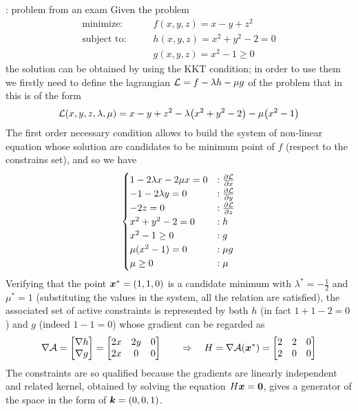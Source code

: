 	
	\begin{example}{: problem from an exam}
		Given the problem
		\begin{align*}
			\textrm{minimize:} \qquad & f(x,y,z) = x - y + z^2 \\
			\textrm{subject to:} \qquad & h(x,y,z) = x^2 + y^2 - 2 = 0 \\
			& g(x,y,z) = x^2-1 \geq 0
		\end{align*}
		the solution can be obtained by using the KKT condition; in order to use them we firstly need to define the lagrangian $\mathcal L = f - \lambda h - \mu g$ of the problem that in this is of the form
		\[ \mathcal L(x,y,z,\lambda,\mu) = x - y + z^2 - \lambda\big(x^2+y^2-2\big) - \mu \big(x^2 - 1\big) \]
		The first order necessary condition allows to build the system of non-linear equation whose solution are candidates to be minimum point of $f$ (respect to the constrains set), and so we have
		\[ \begin{cases}
			1 -2 \lambda x - 2\mu x = 0 & : \frac{\partial \mathcal L}{\partial x} \\
			-1 - 2\lambda y = 0 & : \frac{\partial \mathcal L}{\partial y} \\
			-2z = 0 & : \frac{\partial \mathcal L}{\partial z} \\
			x^2 + y^2 - 2 = 0 & : h \\
			x^2-1 \geq 0 & : g\\
			\mu(x^2-1) = 0 &: \mu g\\
			\mu \geq 0 & : \mu
		\end{cases} \]
		Verifying that the point $\boldsymbol{x}^* = (1,1,0)$ is a candidate minimum with $\lambda^* = -\frac1 2$ and $\mu^* = 1$ (substituting the values in the system, all the relation are satisfied), the associated set of active constraints is represented by both $h$ (in fact $1+1-2=0$) and $g$ (indeed $1-1=0$) whose gradient can be regarded as
		\[ \nabla \mathcal A = \begin{bmatrix}
			\nabla h \\ \nabla g
		\end{bmatrix} = \begin{bmatrix}
			2x & 2y & 0 \\ 2x & 0 & 0	
		\end{bmatrix} \qquad \Rightarrow \quad H = \nabla \mathcal A(\boldsymbol{x}^*) = \begin{bmatrix} 
			2 & 2 & 0 \\ 2 & 0 & 0 
		\end{bmatrix}\]
		The constraints are so qualified because the gradients are linearly independent and related kernel, obtained by solving the equation $H\boldsymbol{x} = \boldsymbol{0}$, gives a generator of the space in the form of $\boldsymbol{k} = (0,0,1)$.
		

\end{example}
